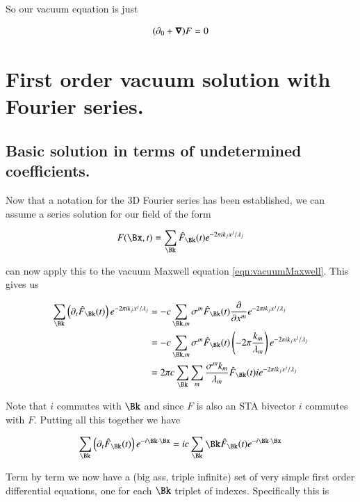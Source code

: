 \documentclass{article}
\begin{document}
So our vacuum equation is just

\begin{align}\label{eqn:vacuumMaxwell}
(\partial_0 + \boldsymbol{\nabla}) F = 0
\end{align}

\section{ First order vacuum solution with Fourier series. }

\subsection{ Basic solution in terms of undetermined coefficients. }

Now that a notation for the 3D Fourier series has been established, we
can assume a series solution for our field of the form

\begin{align}\label{eqn:assumed}
F(\Bx,t) = \sum_{\Bk} \hat{F}_{\Bk}(t) e^{-2\pi i k_j x^j/\lambda_j}
\end{align}

can now apply this to the vacuum Maxwell equation \ref{eqn:vacuumMaxwell}.
This gives us

\begin{align*}
\sum_{\Bk} \left(\partial_t \hat{F}_{\Bk}(t) \right) e^{-2\pi i k_j x^j/\lambda_j}
&= -c \sum_{\Bk, m} \sigma^m \hat{F}_{\Bk}(t) \PD{x^m}{} e^{-2\pi i k_j x^j/\lambda_j} \\
&= -c \sum_{\Bk, m} \sigma^m \hat{F}_{\Bk}(t) \left(-2 \pi \frac{k_m}{\lambda_m}\right) e^{-2\pi i k_j x^j/\lambda_j} \\
&= 2 \pi c \sum_{\Bk} \sum_m \frac{\sigma^m k_m}{\lambda_m} \hat{F}_{\Bk}(t) i e^{-2\pi i k_j x^j/\lambda_j} \\
\end{align*}


Note that $i$ commutes with $\Bk$ and since $F$ is also an STA bivector $i$ commutes with $F$.  Putting all this together we have

\begin{align*}
\sum_{\Bk} \left(\partial_t \hat{F}_{\Bk}(t) \right) e^{-i \Bk \cdot \Bx }
&= i c \sum_{\Bk} \Bk \hat{F}_{\Bk}(t) e^{- i \Bk \cdot \Bx } \\
\end{align*}

Term by term we now have a (big ass, triple infinite) set of very simple first order differential equations, one for each $\Bk$ triplet of indexes.  Specifically this is
\end{document}
